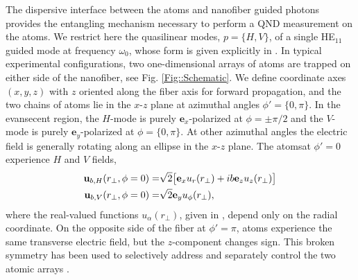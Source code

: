 \documentclass[aps,pra,twocolumn]{revtex4-1} %
\begin{document}
The dispersive interface between the atoms and nanofiber guided photons provides the entangling mechanism necessary to perform a QND measurement on the atoms.  
We restrict here the quasilinear modes, $p =\{H,V\}$, of a single HE$_{11}$ guided mode at frequency $\omega_0$, whose form is given explicitly in .  
In typical experimental configurations, two one-dimensional arrays of atoms are trapped on either side of the nanofiber, see Fig. \ref{Fig::Schematic}. 
We define coordinate axes $(x,y,z)$ with $z$ oriented along the fiber axis for forward propagation, and the two chains of atoms lie in the $x$-$z$ plane at azimuthal angles $\phi' = \{0, \pi\}$.
In the evansecent region, the $H$-mode is purely $\mathbf{e}_x$-polarized at $\phi = \pm \pi/2$ and the $V$-mode is purely $\mathbf{e}_y$-polarized at $\phi = \{0,\pi\}$.  
At other azimuthal angles the electric field is generally rotating along an ellipse in the $x$-$z$ plane.  The atomsat $\phi'=0$ experience $H$ and $V$ fields,
	\begin{align}
		\mathbf{u}_{b,H}(r_\perp, \phi = 0) = & \sqrt{2} \big[ \mathbf{e}_x u_r(r_\perp)+  i b \mathbf{e}_z  u_z(r_\perp) \big] \\
		\mathbf{u}_{b,V}(r_\perp, \phi = 0) = & \sqrt{2} \mathbf{e}_y u_\phi(r_\perp), 
	\end{align}
where the real-valued functions $u_\alpha(r_\perp)$, given in , depend only on the radial coordinate.  
On the opposite side of the fiber at $\phi' = \pi$, atoms experience the same transverse electric field, but the $z$-component changes sign.   This broken symmetry has been used to selectively address and separately control the two atomic arrays \cite{mitsch_exploiting_2014, mitsch_quantum_2014, sayrin_storage_2015}.  
\end{document}
